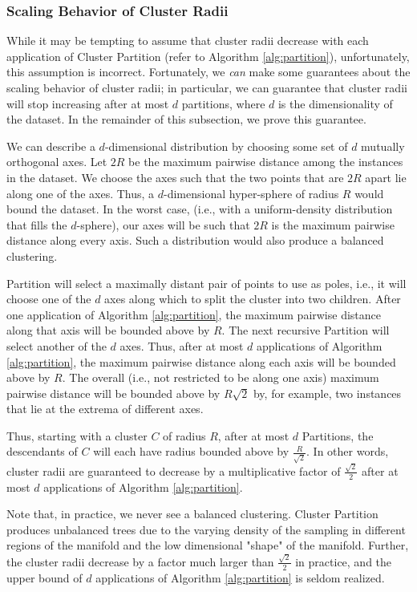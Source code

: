 \subsubsection {Scaling Behavior of Cluster Radii}
\label{subsubsec:methods:guaranteed-decrease-in-cluster-radii}
While it may be tempting to assume that cluster radii decrease with each application of Cluster Partition (refer to Algorithm \ref{alg:partition}), unfortunately, this assumption is incorrect. 
Fortunately, we \emph{can} make some guarantees about the scaling behavior of cluster radii; in particular, we can guarantee that cluster radii will stop increasing after at most 
$d$ partitions, where $d$ is the dimensionality of the dataset.  In the remainder of this subsection, we prove this guarantee. 


We can describe a $d$-dimensional distribution by choosing some set of $d$ mutually orthogonal axes.
Let $2R$ be the maximum pairwise distance among the instances in the dataset. 
We choose the axes such that the two points that are $2R$ apart lie along one of the axes. 
Thus, a $d$-dimensional hyper-sphere of radius $R$ would bound the dataset. 
In the worst case, (i.e., with a uniform-density distribution that fills the $d$-sphere), our axes will be such that $2R$ is the maximum pairwise distance along every axis. 
Such a distribution would also produce a balanced clustering.


Partition will select a maximally distant pair of points to use as poles, i.e., it will choose one of the $d$ axes along
which to split the cluster into two children. 
After one application of Algorithm \ref{alg:partition}, the maximum pairwise distance along that axis will be
bounded above by $R$. 
The next recursive Partition will select another of the $d$ axes. 
Thus, after at most $d$ applications of Algorithm \ref{alg:partition}, the
maximum pairwise distance along each axis will be bounded above by $R$. 
The overall (i.e., not restricted to be along one axis) maximum pairwise distance 
will be bounded above by $R\sqrt{2}$ by, for example, two instances that lie at the extrema of different axes. 

Thus, starting with a cluster $C$ of radius $R$, after at most $d$ Partitions, the descendants of $C$ will each have radius
bounded above by $\frac{R}{\sqrt{2}}$. In other words, cluster radii are guaranteed to decrease by a multiplicative factor of $\frac{\sqrt{2}}{2}$ after at 
most $d$ applications of Algorithm \ref{alg:partition}. 


Note that, in practice, we never see a balanced clustering. Cluster Partition  produces unbalanced trees due to the varying density of the sampling 
in different regions of the manifold and the low dimensional "shape" of the manifold. Further, the cluster radii decrease by a factor much larger than 
$\frac{\sqrt{2}}{2}$ in practice, and the upper bound of $d$ applications of Algorithm \ref{alg:partition} is seldom realized. 


